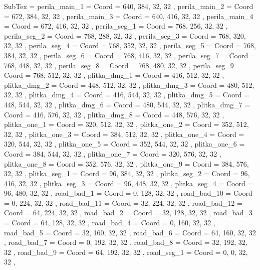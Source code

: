 SubTex = {
	perila_main_1								= { Coord = { 640, 384, 32, 32 } },
	perila_main_2								= { Coord = { 672, 384, 32, 32 } },
	perila_main_3								= { Coord = { 640, 416, 32, 32 } },
	perila_main_4								= { Coord = { 672, 416, 32, 32 } },
	perila_seg_1								= { Coord = { 768, 256, 32, 32 } },
	perila_seg_2								= { Coord = { 768, 288, 32, 32 } },
	perila_seg_3								= { Coord = { 768, 320, 32, 32 } },
	perila_seg_4								= { Coord = { 768, 352, 32, 32 } },
	perila_seg_5								= { Coord = { 768, 384, 32, 32 } },
	perila_seg_6								= { Coord = { 768, 416, 32, 32 } },
	perila_seg_7								= { Coord = { 768, 448, 32, 32 } },
	perila_seg_8								= { Coord = { 768, 480, 32, 32 } },
	perila_seg_9								= { Coord = { 768, 512, 32, 32 } },
	plitka_dmg_1								= { Coord = { 416, 512, 32, 32 } },
	plitka_dmg_2								= { Coord = { 448, 512, 32, 32 } },
	plitka_dmg_3								= { Coord = { 480, 512, 32, 32 } },
	plitka_dmg_4								= { Coord = { 416, 544, 32, 32 } },
	plitka_dmg_5								= { Coord = { 448, 544, 32, 32 } },
	plitka_dmg_6								= { Coord = { 480, 544, 32, 32 } },
	plitka_dmg_7								= { Coord = { 416, 576, 32, 32 } },
	plitka_dmg_8								= { Coord = { 448, 576, 32, 32 } },
	plitka_one_1								= { Coord = { 320, 512, 32, 32 } },
	plitka_one_2								= { Coord = { 352, 512, 32, 32 } },
	plitka_one_3								= { Coord = { 384, 512, 32, 32 } },
	plitka_one_4								= { Coord = { 320, 544, 32, 32 } },
	plitka_one_5								= { Coord = { 352, 544, 32, 32 } },
	plitka_one_6								= { Coord = { 384, 544, 32, 32 } },
	plitka_one_7								= { Coord = { 320, 576, 32, 32 } },
	plitka_one_8								= { Coord = { 352, 576, 32, 32 } },
	plitka_one_9								= { Coord = { 384, 576, 32, 32 } },
	plitka_seg_1								= { Coord = { 96, 384, 32, 32 } },
	plitka_seg_2								= { Coord = { 96, 416, 32, 32 } },
	plitka_seg_3								= { Coord = { 96, 448, 32, 32 } },
	plitka_seg_4								= { Coord = { 96, 480, 32, 32 } },
	road_bad_1								= { Coord = { 0, 128, 32, 32 } },
	road_bad_10								= { Coord = { 0, 224, 32, 32 } },
	road_bad_11								= { Coord = { 32, 224, 32, 32 } },
	road_bad_12								= { Coord = { 64, 224, 32, 32 } },
	road_bad_2								= { Coord = { 32, 128, 32, 32 } },
	road_bad_3								= { Coord = { 64, 128, 32, 32 } },
	road_bad_4								= { Coord = { 0, 160, 32, 32 } },
	road_bad_5								= { Coord = { 32, 160, 32, 32 } },
	road_bad_6								= { Coord = { 64, 160, 32, 32 } },
	road_bad_7								= { Coord = { 0, 192, 32, 32 } },
	road_bad_8								= { Coord = { 32, 192, 32, 32 } },
	road_bad_9								= { Coord = { 64, 192, 32, 32 } },
	road_seg_1								= { Coord = { 0, 0, 32, 32 } },
}
